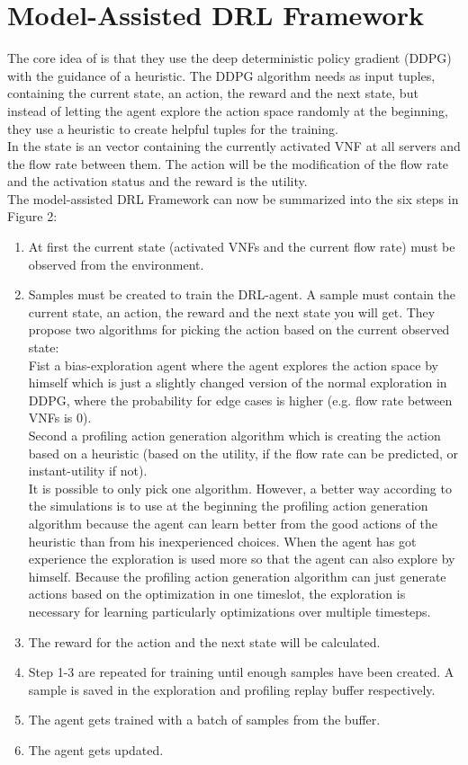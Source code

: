 \section{Model-Assisted DRL Framework}%
\label{sec:drl}
The core idea of \cite{Gu} is that they use the deep deterministic policy gradient (DDPG) with the guidance of a heuristic. The DDPG algorithm needs as input tuples, containing the current state, an action, the reward and the next state, but instead of letting the agent explore the action space randomly at the beginning, they use a heuristic to create helpful tuples for the training.\\
 In \cite{Gu} the state is an vector containing the currently activated VNF at all servers and the flow rate between them. The action will be the modification of the flow rate and the activation status and the reward is the utility.\\
The model-assisted DRL Framework can now be summarized into the six steps in Figure 2:%
\begin{enumerate}
\item At first the current state (activated VNFs and the current flow rate) must be observed from the environment.
\item Samples must be created to train the DRL-agent. A sample must contain the current state, an action, the reward and the next state you will get. They propose two algorithms for picking the action based on the current observed state: \\
Fist a bias-exploration agent where the agent explores the action space by himself which is just a slightly changed version of the normal exploration in DDPG, where the probability for edge cases is higher (e.g. flow rate between VNFs is 0). \\
Second a profiling action generation algorithm which is creating the action based on a heuristic (based on the utility, if the flow rate can be predicted, or instant-utility if not). \\
It is possible to only pick one algorithm. However, a better way according to the simulations is to use at the beginning the profiling action generation algorithm because the agent can learn better from the good actions of the heuristic than from his inexperienced choices. When the agent has got experience the exploration is used more so that the agent can also explore by himself. Because the profiling action generation algorithm can just generate actions based on the optimization in one timeslot, the exploration is necessary for learning  particularly optimizations over multiple timesteps.
\item  The reward for the action and the next state will be calculated.
\item Step 1-3 are repeated for training until enough samples have been created. A sample is saved in the exploration and profiling replay buffer respectively.
\item The agent gets trained with a batch of samples from the buffer.
\item The agent gets updated.
\end{enumerate}

